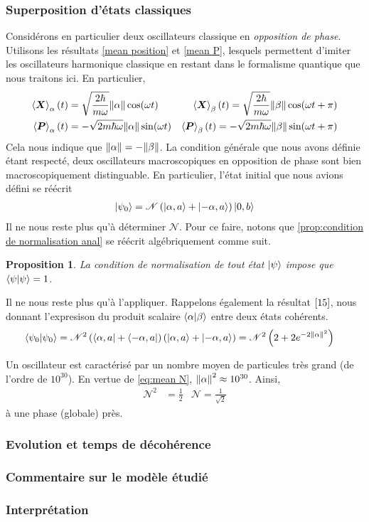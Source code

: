 \documentclass[11pt,oneside,a4paper]{article}
\newcommand{\h}{\ensuremath{\hbar}}
\newtheorem{property}[theorem]{Proposition}
\begin{document}
\subsubsection{Superposition d'états classiques}
Considérons en particulier deux oscillateurs classique en \emph{opposition de phase}. Utilisons les résultats \eqref{mean position} et \eqref{mean P}, lesquels permettent d'imiter les oscillateurs harmonique classique en restant dans le formalisme quantique que nous traitons ici. En particulier,
\begin{align*}
  \expval{\bm{X}}_\alpha (t) &= \sqrt{\frac{2\h}{m\omega}}\norm{\alpha}\cos(\omega t) &\expval{\bm{X}}_\beta (t) = \sqrt{\frac{2\h}{m\omega}}\norm{\beta}\cos(\omega t+\pi)\\
  \expval{\bm{P}}_\alpha (t) &= -\sqrt{2m\h\omega}\norm{\alpha}\sin(\omega t) &\expval{\bm{P}}_\beta (t) = -\sqrt{2m\h\omega}\norm{\beta}\sin(\omega t+\pi)
\end{align*}
Cela nous indique que $\norm{\alpha} = -\norm{\beta}$. La condition générale que nous avons définie étant respecté, deux oscillateurs macroscopiques en opposition de phase sont bien macroscopiquement distinguable. En particulier, l'état initial que nous avions défini se réécrit
\begin{align*}
  \ket{\psi_0} = \mathcal{N}\left(\ket{\alpha,a}+\ket{-\alpha,a}\right)\ket{0,b}
\end{align*}
Il ne nous reste plus qu'à déterminer $\mathcal{N}$. Pour ce faire, notons que \ref{prop:condition de normalisation anal} se réécrit algébriquement comme suit.
\begin{property}
  La condition de normalisation de tout état $\ket{\psi}$ impose que $\braket{\psi} = 1$.
\end{property}

Il ne nous reste plus qu'à l'appliquer. Rappelons également la résultat $\eqref{15}$, nous donnant l'expresison du produit scalaire $\braket{\alpha}{\beta}$ entre deux états cohérents.
\begin{align*}
  \braket{\psi_0} &= \mathcal{N}^2\left(\bra{\alpha,a}+\bra{-\alpha,a}\right)\left(\ket{\alpha,a}+\ket{-\alpha,a}\right) = \mathcal{N}^2\left(2+2e^{-2\norm{\alpha}^2}\right)
\end{align*}

Un oscillateur est caractérisé par un nombre moyen de particules très grand (de l'ordre de $10^{30}$). En vertue de \eqref{eq:mean N}, $\norm{\alpha}^2 \approx 10^{30}$. Ainsi, 
\begin{align}
  \mathcal{N}^2 &= \frac{1}{2} &\mathcal{N} = \frac{1}{\sqrt{2}}
\end{align} 
à une phase (globale) près.

\subsubsection{Evolution et temps de décohérence}
\subsubsection{Commentaire sur le modèle étudié}
\subsubsection{Interprétation}
\end{document}

